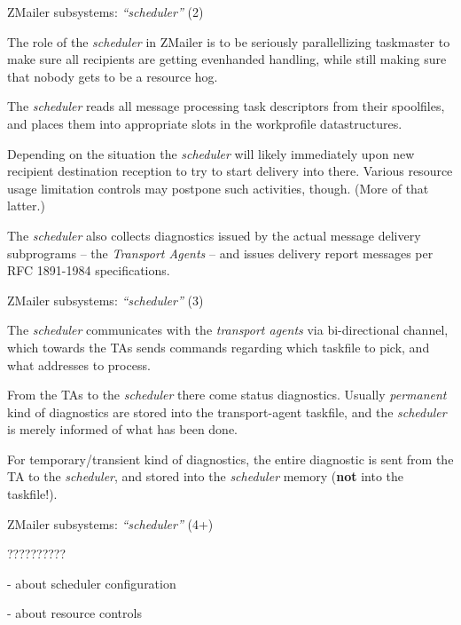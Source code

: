 \documentclass[a4paper,landscape]{slides}
\newcommand{\ZM}{ZMailer}
\begin{document}
\begin{slide}
\centerline{\large \ZM{} subsystems: {\em ``scheduler''} (2)}

\small
The role of the {\em scheduler} in \ZM{} is to be seriously parallellizing
taskmaster to make sure all recipients are getting evenhanded handling,
while still making sure that nobody gets to be a resource hog.

The {\em scheduler} reads all message processing task descriptors
from their spoolfiles, and places them into appropriate slots in
the workprofile datastructures.

Depending on the situation the {\em scheduler} will likely immediately
upon new recipient destination reception to try to start delivery into there.
Various resource usage limitation controls may postpone such activities,
though. (More of that latter.)

The {\em scheduler} also collects diagnostics issued by the actual
message delivery subprograms -- the {\em Transport Agents} -- and
issues delivery report messages per RFC 1891-1984 specifications.

\vfill
\end{slide}

\begin{slide}
\centerline{\large \ZM{} subsystems: {\em ``scheduler''} (3)}

The {\em scheduler} communicates with the {\em transport agents}
via bi-directional channel, which towards the TAs sends commands
regarding which taskfile to pick, and what addresses to process.

From the TAs to the {\em scheduler} there come status diagnostics.
Usually {\em permanent} kind of diagnostics are stored into the
transport-agent taskfile, and the {\em scheduler} is merely informed
of what has been done.

For temporary/transient kind of diagnostics, the entire diagnostic
is sent from the TA to the {\em scheduler}, and stored into the
{\em scheduler} memory ({\bf not} into the taskfile!).

\vfill
\end{slide}

\begin{slide}
\centerline{\large \ZM{} subsystems: {\em ``scheduler''} (4+)}

{\Huge ??????????}

- about scheduler configuration

- about resource controls

\vfill
\end{slide}
\end{document}

